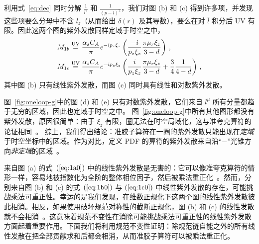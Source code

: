 利用式~\eqref{eq:dec} 同时分解 $\frac{1}{l^2} $ 和 $\frac{1}{(p-l)^2}$，我们对图 (b) 和 (c) 得到许多项，并发现这些项要么分母中不含 $l_z$（从而给出 $\delta(r)$ 及其导数），要么在对 $\bar{l}$ 积分后 UV 有限。因此这两个图的紫外发散同样定域于时空之中，
\begin{align}
M_{1{b}}
&\stackrel{\text{\text{UV}}}{=} \frac{\alpha_s C_A}{\pi} e^{-i p_z \xi_z} \left(\frac{-i}{p_z \xi_z} \frac{\pi \mu_r \xi_z}{3-d} \right) \, , \label{eq:1b0}\\
M_{1c}
&\stackrel{\text{\text{UV}}}{=} \frac{\alpha_s C_A}{\pi} e^{-i p_z \xi_z} \left(\frac{i}{p_z \xi_z} \frac{\pi \mu_r \xi_z}{3-d}+\frac{3}{4} \frac{1}{4-d} \right) \, ,
\label{eq:1c0}
\end{align}
其中图 (b) 只有线性紫外发散，而图 (c) 同时具有线性和对数紫外发散。

图~\ref{fig:oneloop-g}中的图 (d) 和 (e) 只有对数紫外发散，它们来自 $l^\mu$ 所有分量都趋于无穷的区域，因此也定域于时空之中。
图~\ref{fig:oneloop-g}中所有其他图形都没有紫外发散，原因很简单：由于 $\xi_z$ 有限，圈无法在时空局域化，这与准夸克算符的论证相同~\cite{Ishikawa:2017faj}。
综上，我们得出结论：准胶子算符在一圈的紫外发散只能出现在\textit{定域}于时空坐标中的区域。作为对比，定义 PDF 的算符的紫外发散来自沿“$-$”光锥方向\textit{非定域}的区域~\cite{Ishikawa:2017faj}。

来自图 (a) 的式~$(\ref{eq:1a0})$ 中的线性紫外发散是无害的：它可以像准夸克算符的情形一样，容易地被指数化为全阶的整体相位因子，然后被乘法重正化~\cite{Ishikawa:2017faj,Polyakov:1980ca,Dotsenko:1979wb}。然而，分别来自图 (b) 和 (c) 的式~$(\ref{eq:1b0})$ 与 $(\ref{eq:1c0})$ 中线性紫外发散的存在，可能挑战乘法可重正性。幸运的是我们发现，在维数正规化下这两个图的线性紫外发散彼此相消。相反，如果使用破坏规范对称性的截断正规化，图 (b) 和 (c) 的线性发散就不会相消~\cite{Wang:2017qyg,Wang:2017eel}。这意味着规范不变性在消除可能挑战乘法可重正性的线性紫外发散方面起着重要作用。下面我们将利用规范不变性证明：除规范链自能之外的所有线性发散在把全部贡献求和后都会相消，从而准胶子算符可以被乘法重正化。
